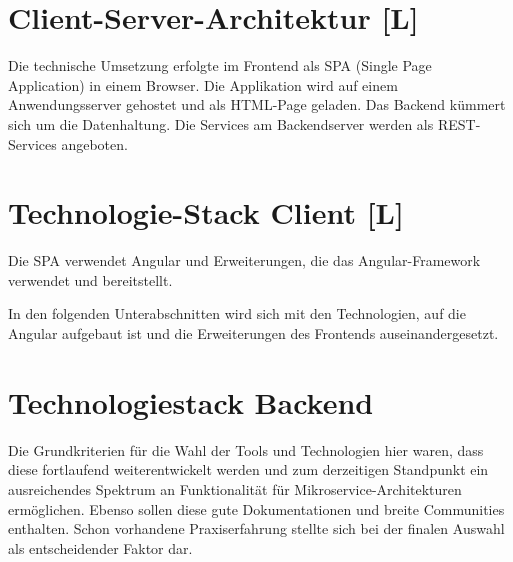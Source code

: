 \section{Client-Server-Architektur [L]}
Die technische Umsetzung erfolgte im Frontend als SPA (Single Page Application) in einem Browser. Die Applikation wird auf einem Anwendungsserver gehostet und als HTML-Page geladen. Das Backend kümmert sich um die Datenhaltung. Die Services am Backendserver werden als REST-Services angeboten.

\section{Technologie-Stack Client [L]}
Die SPA verwendet Angular und Erweiterungen, die das Angular-Framework verwendet und bereitstellt.

In den folgenden Unterabschnitten wird sich mit den Technologien, auf die Angular aufgebaut ist und die Erweiterungen des Frontends auseinandergesetzt.




\section{Technologiestack Backend}
Die Grundkriterien für die Wahl der Tools und Technologien hier waren, dass diese fortlaufend weiterentwickelt werden und zum derzeitigen Standpunkt ein ausreichendes Spektrum an Funktionalität für Mikroservice-Architekturen ermöglichen.\cite{MicroserviceAbout} Ebenso sollen diese gute Dokumentationen und breite Communities enthalten. Schon vorhandene Praxiserfahrung stellte sich bei der finalen Auswahl als entscheidender Faktor dar.



